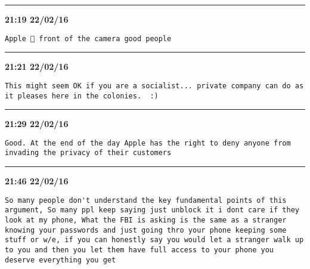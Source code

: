 \hrule%

\begin{adjustwidth}{0cm}{0cm}
\footnotesize \textbf{21:19 22/02/16}

\begin{lstlisting}[breaklines, breakatwhitespace, basicstyle=\small, frame=leftline]
Apple 🍎 front of the camera good people
\end{lstlisting}
\end{adjustwidth}

\hrule%

\begin{adjustwidth}{0cm}{0cm}
\footnotesize \textbf{21:21 22/02/16}

\begin{lstlisting}[breaklines, breakatwhitespace, basicstyle=\small, frame=leftline]
This might seem OK if you are a socialist... private company can do as it pleases here in the colonies.  :)
\end{lstlisting}
\end{adjustwidth}

\hrule%

\begin{adjustwidth}{0cm}{0cm}
\footnotesize \textbf{21:29 22/02/16}

\begin{lstlisting}[breaklines, breakatwhitespace, basicstyle=\small, frame=leftline]
Good. At the end of the day Apple has the right to deny anyone from invading the privacy of their customers
\end{lstlisting}
\end{adjustwidth}

\hrule%

\begin{adjustwidth}{0cm}{0cm}
\footnotesize \textbf{21:46 22/02/16}

\begin{lstlisting}[breaklines, breakatwhitespace, basicstyle=\small, frame=leftline]
So many people don't understand the key fundamental points of this argument, So many ppl keep saying just unblock it i dont care if they look at my phone, What the FBI is asking is the same as a stranger knowing your passwords and just going thro your phone keeping some stuff or w/e, if you can honestly say you would let a stranger walk up to you and then you let them have full access to your phone you deserve everything you get
\end{lstlisting}
\end{adjustwidth}

